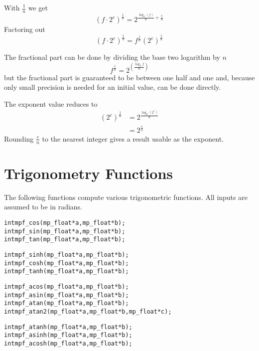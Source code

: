 \documentclass[a4paper]{book}
\theoremstyle{definition}
\theoremstyle{remark}
\begin{document}
With $\tfrac{1}{n}$ we get
\begin{equation}
(f \cdot 2^e)^\frac{1}{n} = 2^{ \frac{\log_2(f) }{ n} + \frac{e}{n}}
\end{equation}
Factoring out
\begin{equation}
(f \cdot 2^e)^\frac{1}{n}  = f^\frac{1}{n} (2^e)^\frac{1}{n}
\end{equation}

The fractional part can be done by dividing the base two logarithm by $n$
\begin{equation}
f^\frac{1}{n} = 2^(\frac{\log_2 f}{n})
\end{equation}
but the fractional part is guaranteed to be between one half and one and, because only small precision is needed for an initial value, can be done directly.

The exponent value reduces to
\begin{equation}
\begin{split}
(2^e)^\frac{1}{n}& = 2^\frac{\log_2(2^e)}{n}\\
                 & = 2^\frac{e}{n}
\end{split}
\end{equation}
Rounding $\frac{e}{n}$ to the nearest integer gives a result usable as the exponent.


\section{Trigonometry Functions}
The following functions compute various trigonometric functions.  All inputs are assumed to be in radians.

      
\begin{alltt}
int  mpf_cos(mp_float *a, mp_float *b);
int  mpf_sin(mp_float *a, mp_float *b);
int  mpf_tan(mp_float *a, mp_float *b);

int  mpf_sinh(mp_float * a, mp_float * b);
int  mpf_cosh(mp_float * a, mp_float * b);
int  mpf_tanh(mp_float * a, mp_float * b);

int  mpf_acos(mp_float *a, mp_float *b);
int  mpf_asin(mp_float *a, mp_float *b);
int  mpf_atan(mp_float *a, mp_float *b);
int  mpf_atan2(mp_float * a, mp_float * b, mp_float *c);

int mpf_atanh(mp_float * a, mp_float * b);
int mpf_asinh(mp_float * a, mp_float * b);
int mpf_acosh(mp_float * a, mp_float * b);
\end{alltt}
\end{document}
